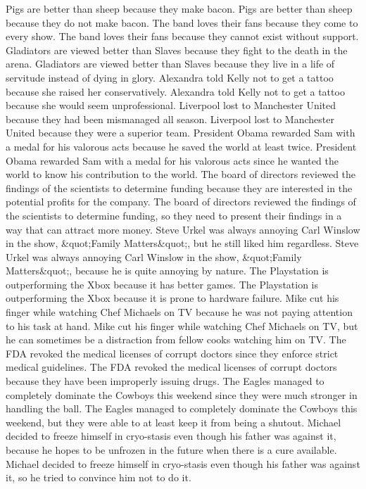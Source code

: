 \documentclass{article}
\begin{document}
\begin{enumerate}
	Pigs are better than sheep because they make bacon.
	Pigs are better than sheep because they do not make bacon.
	The band loves their fans because they come to every show.
	The band loves their fans because they cannot exist without support.
	Gladiators are viewed better than Slaves because they fight to the death in the arena.
	Gladiators are viewed better than Slaves because they live in a life of servitude instead of dying in glory.
	Alexandra told Kelly not to get a tattoo because she raised her conservatively.
	Alexandra told Kelly not to get a tattoo because she would seem unprofessional.
	Liverpool lost to Manchester United because they had been mismanaged all season.
	Liverpool lost to Manchester United because they were a superior team.
	President Obama rewarded Sam with a medal for his valorous acts because he saved the world at least twice.
	President Obama rewarded Sam with a medal for his valorous acts since he wanted the world to know his contribution to the world.
	The board of directors reviewed the findings of the scientists to determine funding because they are interested in the potential profits for the company.
	The board of directors reviewed the findings of the scientists to determine funding, so they need to present their findings in a way that can attract more money.
	Steve Urkel was always annoying Carl Winslow in the show, &quot;Family Matters&quot;, but he still liked him regardless.
	Steve Urkel was always annoying Carl Winslow in the show, &quot;Family Matters&quot;, because he is quite annoying by nature.
	The Playstation is outperforming the Xbox because it has better games.
	The Playstation is outperforming the Xbox because it is prone to hardware failure.
	Mike cut his finger while watching Chef Michaels on TV because he was not paying attention to his task at hand.
	Mike cut his finger while watching Chef Michaels on TV, but he can sometimes be a distraction from fellow cooks watching him on TV.
	The FDA revoked the medical licenses of corrupt doctors since they enforce strict medical guidelines.
	The FDA revoked the medical licenses of corrupt doctors because they have been improperly issuing drugs.
	The Eagles managed to completely dominate the Cowboys this weekend since they were much stronger in handling the ball.
	The Eagles managed to completely dominate the Cowboys this weekend, but they were able to at least keep it from being a shutout.
	Michael decided to freeze himself in cryo-stasis even though his father was against it, because he hopes to be unfrozen in the future when there is a cure available.
	Michael decided to freeze himself in cryo-stasis even though his father was against it, so he tried to convince him not to do it.

\end{enumerate}
\end{document}
